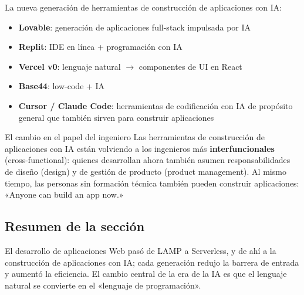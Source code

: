 La nueva generación de herramientas de construcción de aplicaciones con IA:
\begin{itemize}
    \item \textbf{Lovable}: generación de aplicaciones full-stack impulsada por IA
    \item \textbf{Replit}: IDE en línea + programación con IA
    \item \textbf{Vercel v0}: lenguaje natural $\rightarrow$ componentes de UI en React
    \item \textbf{Base44}: low-code + IA
    \item \textbf{Cursor / Claude Code}: herramientas de codificación con IA de propósito general que también sirven para construir aplicaciones
\end{itemize}

\begin{knowledgebox}{El cambio en el papel del ingeniero}
Las herramientas de construcción de aplicaciones con IA están volviendo a los ingenieros más \textbf{interfuncionales} (cross-functional): quienes desarrollan ahora también asumen responsabilidades de diseño (design) y de gestión de producto (product management). Al mismo tiempo, las personas sin formación técnica también pueden construir aplicaciones: «Anyone can build an app now.»
\end{knowledgebox}

\subsection{Resumen de la sección}

El desarrollo de aplicaciones Web pasó de LAMP a Serverless, y de ahí a la construcción de aplicaciones con IA; cada generación redujo la barrera de entrada y aumentó la eficiencia. El cambio central de la era de la IA es que el lenguaje natural se convierte en el «lenguaje de programación».

